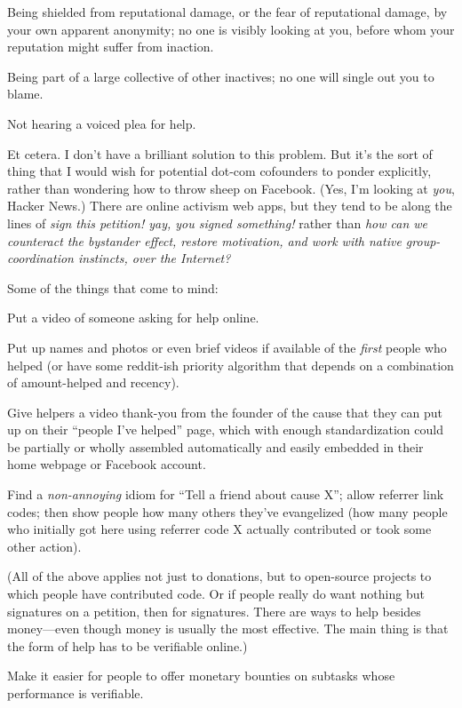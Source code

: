{
 Being shielded from reputational damage, or the fear of
reputational damage, by your own apparent anonymity; no one is visibly
looking at you, before whom your reputation might suffer from
inaction.}

{
 Being part of a large collective of other inactives; no one will
single out you to blame.}

{
 Not hearing a voiced plea for help.}

{
 Et cetera. I don't have a brilliant solution to
this problem. But it's the sort of thing that I would
wish for potential dot-com cofounders to ponder explicitly, rather than
wondering how to throw sheep on Facebook. (Yes, I'm
looking at \textit{you}, Hacker News.) There are online activism web
apps, but they tend to be along the lines of \textit{sign this
petition! yay, you signed something!} rather than \textit{how can we
counteract the bystander effect, restore motivation, and work with
native group-coordination instincts, over the Internet?}}

{
 Some of the things that come to mind:}

{
 Put a video of someone asking for help online.}

{
 Put up names and photos or even brief videos if available of the
\textit{first} people who helped (or have some reddit-ish priority
algorithm that depends on a combination of amount-helped and recency).}

{
 Give helpers a video thank-you from the founder of the cause that
they can put up on their ``people I've
helped'' page, which with enough standardization
could be partially or wholly assembled automatically and easily
embedded in their home webpage or Facebook account.}

{
 Find a \textit{non-annoying} idiom for ``Tell a
friend about cause X''; allow referrer link codes;
then show people how many others they've evangelized
(how many people who initially got here using referrer code X actually
contributed or took some other action).}

{
 (All of the above applies not just to donations, but to
open-source projects to which people have contributed code. Or if
people really do want nothing but signatures on a petition, then for
signatures. There are ways to help besides money---even though money is
usually the most effective. The main thing is that the form of help has
to be verifiable online.)}

{
 Make it easier for people to offer monetary bounties on subtasks
whose performance is verifiable.}

